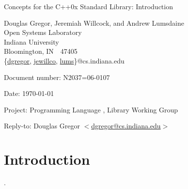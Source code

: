 \documentclass[american,twoside]{book}
\begin{document}
\raggedbottom

\begin{titlepage}
\begin{center}
\huge
Concepts for the C++0x Standard Library: Introduction

\vspace{0.5in}

\normalsize
Douglas Gregor, Jeremiah Willcock, and Andrew Lumsdaine \\
Open Systems Laboratory \\
Indiana University \\
Bloomington, IN\ \  47405 \\
\{\href{mailto:dgregor@cs.indiana.edu}{dgregor}, \href{mailto:jewillco@cs.indiana.edu}{jewillco}, \href{mailto:lums@cs.indiana.edu}{lums}\}@cs.indiana.edu
\end{center}

\vspace{1in}
\par\noindent Document number: N2037=06-0107\vspace{-6pt}
\par\noindent Date: \today\vspace{-6pt}
\par\noindent Project: Programming Language \Cpp{}, Library Working Group\vspace{-6pt}
\par\noindent Reply-to: Douglas Gregor $<$\href{mailto:dgregor@cs.indiana.edu}{dgregor@cs.indiana.edu}$>$\vspace{-6pt}

\section*{Introduction}
.
\end{titlepage}

\pagestyle{fancy}
\fancyhead[LE,RO]{\textbf{\rightmark}}
\fancyhead[RE]{\textbf{\leftmark\hspace{1em}\thepage}}
\fancyhead[LO]{\textbf{\thepage\hspace{1em}\leftmark}}


\renewcommand{\sectionmark}[1]{\markright{\thesection\hspace{1em}#1}}
\renewcommand{\chaptermark}[1]{\markboth{#1}{}}
\end{document}
